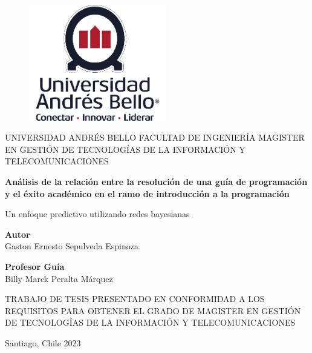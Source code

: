\begin{titlepage}
    \begin{figure}[h]
        \centering
        \includegraphics[width=2.36111in,height=1.98611in]{img/image1.png}
    \end{figure}
    \begin{center}
        \vspace*{0.5cm}
        \LARGE
        UNIVERSIDAD ANDRÉS BELLO
        FACULTAD DE INGENIERÍA
        MAGISTER EN GESTIÓN DE TECNOLOGÍAS DE LA INFORMACIÓN Y TELECOMUNICACIONES
        \vfill
        
        \Huge
        \textbf{Análisis de la relación entre la resolución de una guía de programación y el éxito académico en el ramo de introducción a la programación}
        \vfill

        \LARGE
        Un enfoque predictivo utilizando redes bayesianas        
        \vfill

        \textbf{Autor}\\
        Gaston Ernesto Sepulveda Espinoza
        \vfill

        \textbf{Profesor Guía}\\
        Billy Marck Peralta Márquez
        \vfill
        \begin{flushright}
            TRABAJO DE TESIS PRESENTADO EN CONFORMIDAD 
            A LOS REQUISITOS PARA OBTENER EL GRADO DE 
            MAGISTER EN GESTIÓN DE TECNOLOGÍAS DE LA INFORMACIÓN Y TELECOMUNICACIONES
        \end{flushright}
        \vfill

        \Large
        Santiago, Chile 2023         
        \vfill
    \end{center}
\end{titlepage}